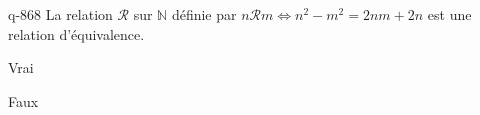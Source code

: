 \begin{truefalse}{q-868}
La relation $\mathcal R$ sur $\mathbb N$ définie par $n\mathcal R m \iff n^2-m^2 = 2nm+2n$ est une relation d'équivalence.
\item Vrai
\item* Faux
\end{truefalse}

